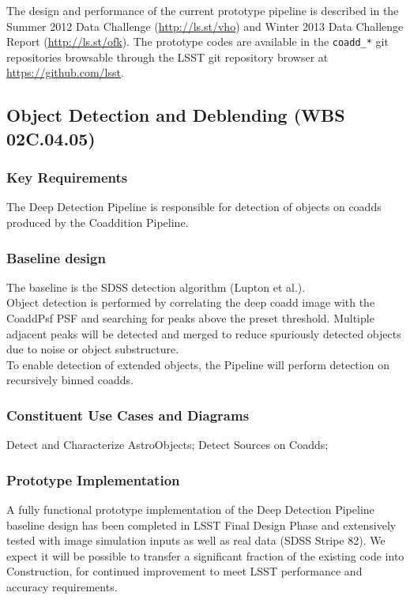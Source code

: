 \documentclass[12pt]{article}
\newcommand{\wbsDetDeblend}{WBS 02C.04.05}
\begin{document}
The design and performance of the current prototype pipeline is described in the Summer 2012 Data Challenge (\url{http://ls.st/vho}) and Winter 2013 Data Challenge Report (\url{http://ls.st/ofk}). The prototype codes are available in the {\tt coadd\_*} git repositories browsable through the LSST git repository browser at \url{https://github.com/lsst}.

\clearpage

\subsection{Object Detection and Deblending (\wbsDetDeblend)}

\subsubsection{Key Requirements}

The Deep Detection Pipeline is responsible for detection of objects on coadds produced by the Coaddition Pipeline.

\subsubsection{Baseline design}

The baseline is the SDSS detection algorithm (Lupton et al.).
\\

Object detection is performed by correlating the deep coadd image with the CoaddPsf PSF and searching for peaks above the preset threshold. Multiple adjacent peaks will be detected and merged to reduce spuriously detected objects due to noise or object substructure.
\\

To enable detection of extended objects, the Pipeline will perform detection on recursively binned coadds.

\subsubsection{Constituent Use Cases and Diagrams}

Detect and Characterize AstroObjects;
Detect Sources on Coadds;

\subsubsection{Prototype Implementation}

A fully functional prototype implementation of the Deep Detection Pipeline baseline design has been completed in LSST Final Design Phase and extensively tested with image simulation inputs as well as real data (SDSS Stripe 82). We expect it will be possible to transfer a significant fraction of the existing code into Construction, for continued improvement to meet LSST performance and accuracy requirements. %
\\
\end{document}
